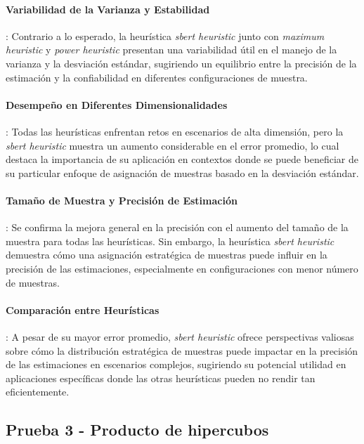 \documentclass{article}
\begin{document}
\paragraph{Variabilidad de la Varianza y Estabilidad}: Contrario a lo esperado, la heurística \textit{sbert heuristic} junto con \textit{maximum heuristic} y \textit{power heuristic} presentan una variabilidad útil en el manejo de la varianza y la desviación estándar, sugiriendo un equilibrio entre la precisión de la estimación y la confiabilidad en diferentes configuraciones de muestra.

\paragraph{Desempeño en Diferentes Dimensionalidades}: Todas las heurísticas enfrentan retos en escenarios de alta dimensión, pero la \textit{sbert heuristic} muestra un aumento considerable en el error promedio, lo cual destaca la importancia de su aplicación en contextos donde se puede beneficiar de su particular enfoque de asignación de muestras basado en la desviación estándar.

\paragraph{Tamaño de Muestra y Precisión de Estimación}: Se confirma la mejora general en la precisión con el aumento del tamaño de la muestra para todas las heurísticas. Sin embargo, la heurística \textit{sbert heuristic} demuestra cómo una asignación estratégica de muestras puede influir en la precisión de las estimaciones, especialmente en configuraciones con menor número de muestras.

\paragraph{Comparación entre Heurísticas}: A pesar de su mayor error promedio, \textit{sbert heuristic} ofrece perspectivas valiosas sobre cómo la distribución estratégica de muestras puede impactar en la precisión de las estimaciones en escenarios complejos, sugiriendo su potencial utilidad en aplicaciones específicas donde las otras heurísticas pueden no rendir tan eficientemente.

\subsection{Prueba 3 - Producto de hipercubos}
\end{document}
